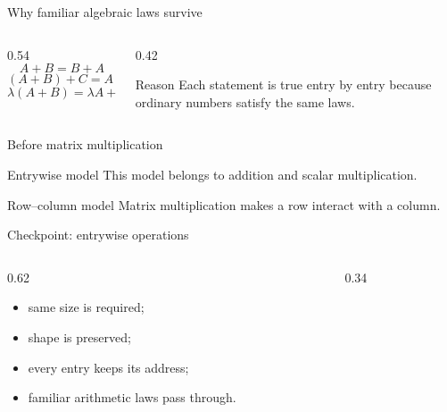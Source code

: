 \begin{frame}{Why familiar algebraic laws survive}
  \begin{columns}[T,onlytextwidth]
    \begin{column}{0.54\textwidth}
      \[
      A+B=B+A
      \]
      \[
      (A+B)+C=A+(B+C)
      \]
      \[
      \lambda(A+B)=\lambda A+\lambda B
      \]
    \end{column}
    \begin{column}{0.42\textwidth}
      \begin{exampleblock}{Reason}
        Each statement is true entry by entry because ordinary numbers satisfy the same laws.
      \end{exampleblock}
    \end{column}
  \end{columns}
\end{frame}

\begin{frame}{Before matrix multiplication}
  \begin{alertblock}{Entrywise model}
    This model belongs to addition and scalar multiplication.
  \end{alertblock}

  \vspace{0.5cm}
  \begin{exampleblock}{Row--column model}
    Matrix multiplication makes a row interact with a column.
  \end{exampleblock}

  \vspace{0.55cm}
\end{frame}

\begin{frame}{Checkpoint: entrywise operations}
  \begin{columns}[T,onlytextwidth]
    \begin{column}{0.62\textwidth}
      \Large
      \begin{itemize}
        \item same size is required;
        \item shape is preserved;
        \item every entry keeps its address;
        \item familiar arithmetic laws pass through.
      \end{itemize}
    \end{column}
    \begin{column}{0.34\textwidth}
    \end{column}
  \end{columns}
\end{frame}
